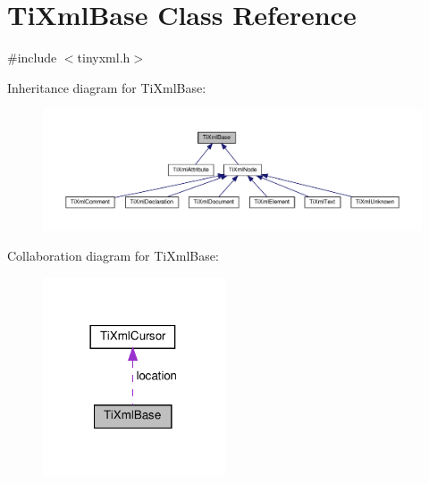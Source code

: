 \hypertarget{classTiXmlBase}{}\section{Ti\+Xml\+Base Class Reference}
\label{classTiXmlBase}


{\ttfamily \#include $<$tinyxml.\+h$>$}



Inheritance diagram for Ti\+Xml\+Base\+:
\nopagebreak
\begin{figure}[H]
\begin{center}
\leavevmode
\includegraphics[width=350pt]{classTiXmlBase__inherit__graph}
\end{center}
\end{figure}


Collaboration diagram for Ti\+Xml\+Base\+:
\nopagebreak
\begin{figure}[H]
\begin{center}
\leavevmode
\includegraphics[width=153pt]{classTiXmlBase__coll__graph}
\end{center}
\end{figure}
